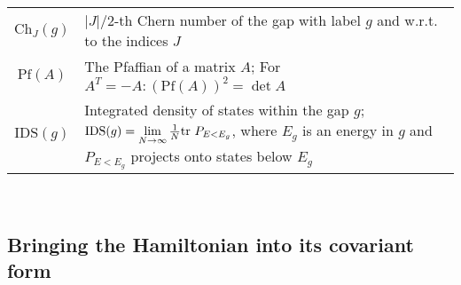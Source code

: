 \documentclass[
    aps,
    prb,
    twocolumn,
    floatfix,
    superscriptaddress,
	10pt
]{revtex4-2}
\begin{document}
\begin{table*}[t!]
\begin{tabular}{c|p{15cm}}
	$\mathrm{Ch}_J(g) $ &  $|J|/2$-th Chern number of the gap with label $g$ and w.r.t. to the indices $J$ \\
	$\mathrm{Pf}(A)$ &  The Pfaffian of a matrix $A$; For $A^T = -A\colon (\mathrm{Pf}(A))^2 = \det A$ \\
	$\mathrm{IDS}(g)$ & Integrated density of states within the gap $g$; $\mathrm{IDS}(g) = \lim\limits_{N\to\infty}  \frac{1}{N} \mathrm{tr}~P_{E<E_g}$, where $E_g$ is an energy in $g$ and $P_{E<E_g}$ projects onto states below $E_g$
\\ \bottomrule
	\end{tabular}\\
\end{table*}

\clearpage



\subsection{Bringing the Hamiltonian into its covariant form}
\end{document}
